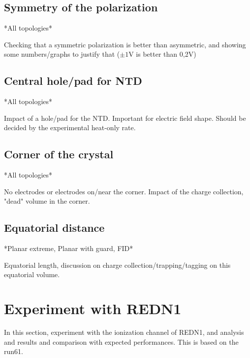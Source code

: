 \subsection{Symmetry of the polarization}

*All topologies*

Checking that a symmetric polarization is better than asymmetric,
and showing some numbers/graphs to justify that
($\pm1$V is better than 0,2V)

\subsection{Central hole/pad for NTD}

*All topologies*

Impact of a hole/pad for the NTD. Important for electric field shape.
Should be decided by the experimental heat-only rate.

\subsection{Corner of the crystal}

*All topologies*

No electrodes or electrodes on/near the corner.
Impact of the charge collection, "dead" volume in the corner.

\subsection{Equatorial distance}

*Planar extreme, Planar with guard, FID*

Equatorial length, discussion on charge collection/trapping/tagging on this equatorial volume.

\section{Experiment with REDN1}

In this section, experiment with the ionization channel of REDN1, and analysis and results and comparison with expected performances. This is based on the run61.

